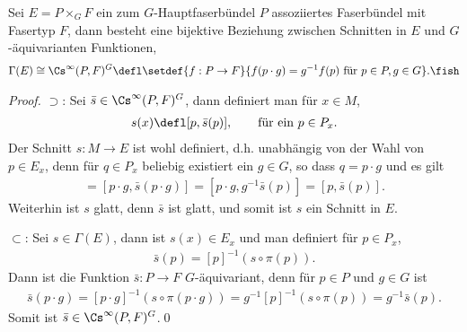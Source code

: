 \documentclass[%
	paper=a5,%
	fleqn,%
	DIV=18,%
	BCOR=0mm,
	fontsize=11pt,
	titlepage=false,%
	bibliography=totoc,
	DIV=18,%
	twoside=true,
	pdftitle=Riemannsche Geometrie,
	pdfauthor=Uwe Semmelmann,
	numbers=noendperiod]%
	{scrbook}
\begin{document}
\begin{lem}
Sei $E = P\times_G F$ ein zum $G$-Hauptfaserbündel $P$ assoziiertes
Faserbündel mit Fasertyp $F$, dann besteht eine bijektive Beziehung zwischen
Schnitten in $E$ und $G$-äquivarianten Funktionen,
\begin{align*}
\Gamma(E) \cong \Cs^\infty(P,F)^G \defl
\setdef{f : P\to F}{f(p\cdot g) = g^{-1}f(p)\text{ für }p\in P,g\in G}.\fish
\end{align*}
\end{lem}
\begin{proof}
$\supset$: Sei $\bar{s}\in \Cs^\infty(P,F)^G$, dann definiert man für $x\in M$,
\begin{align*}
s(x) \defl [p,\bar{s}(p)],\qquad \text{für ein }p\in P_x.
\end{align*}
Der Schnitt $s:M\to E$ ist wohl definiert, d.h. unabhängig von der Wahl von $p \in E_x$,
denn für $q\in P_x$ beliebig existiert ein
$g\in G$, so dass $q = p\cdot g$ und es gilt
\begin{align*}
[q,\bar{s}(q)] = [p\cdot g,\bar{s}(p\cdot g)]
= [p\cdot g,g^{-1}\bar{s}(p)] = [p,\bar{s}(p)].
\end{align*}
Weiterhin ist $s$ glatt, denn $\bar{s}$ ist glatt, und somit ist $s$ ein Schnitt
in $E$.

$\subset$: Sei $s\in \Gamma(E)$, dann ist $s(x) \in E_x$ und man definiert für
$p\in P_x$,
\begin{align*}
\bar{s}(p) = [p]^{-1}(s\circ \pi(p)). 
\end{align*}
Dann ist die Funktion $\bar{s}:P\to F$ $G$-äquivariant, denn für $p\in P$ und
$g\in G$ ist
\begin{align*}
\bar{s}(p\cdot g) = [p\cdot g]^{-1}(s\circ \pi(p\cdot g))
= g^{-1}[p]^{-1}(s\circ \pi(p)) = g^{-1}\bar{s}(p).
\end{align*} 
Somit ist $\bar{s}\in \Cs^\infty(P,F)^G$.\qed
\end{proof}
\end{document}
